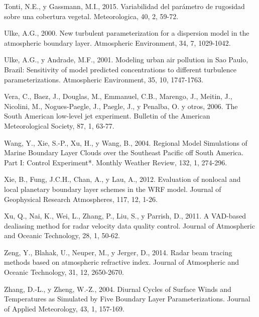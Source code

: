 \documentclass[12pt,spanish,oneside]{book}
\begin{document}
\hypertarget{ref-Tonti2015}{}
Tonti, N.E., y Gassmann, M.I., 2015. Variabilidad del parámetro de
rugosidad sobre una cobertura vegetal. Meteorologica, 40, 2, 59-72.

\hypertarget{ref-Ulke2000}{}
Ulke, A.G., 2000. New turbulent parameterization for a dispersion model
in the atmospheric boundary layer. Atmospheric Environment, 34, 7,
1029-1042.

\hypertarget{ref-Ulke2001}{}
Ulke, A.G., y Andrade, M.F., 2001. Modeling urban air pollution in Sao
Paulo, Brazil: Sensitivity of model predicted concentrations to
different turbulence parameterizations. Atmospheric Environment, 35, 10,
1747-1763.

\hypertarget{ref-Vera2006}{}
Vera, C., Baez, J., Douglas, M., Emmanuel, C.B., Marengo, J., Meitin,
J., Nicolini, M., Nogues-Paegle, J., Paegle, J., y Penalba, O. y otros,
2006. The South American low-level jet experiment. Bulletin of the
American Meteorological Society, 87, 1, 63-77.

\hypertarget{ref-Wang2004}{}
Wang, Y., Xie, S.-P., Xu, H., y Wang, B., 2004. Regional Model
Simulations of Marine Boundary Layer Clouds over the Southeast Pacific
off South America. Part I: Control Experiment*. Monthly Weather Review,
132, 1, 274-296.

\hypertarget{ref-Xie2012}{}
Xie, B., Fung, J.C.H., Chan, A., y Lau, A., 2012. Evaluation of nonlocal
and local planetary boundary layer schemes in the WRF model. Journal of
Geophysical Research Atmospheres, 117, 12, 1-26.

\hypertarget{ref-Xu2011}{}
Xu, Q., Nai, K., Wei, L., Zhang, P., Liu, S., y Parrish, D., 2011. A
VAD-based dealiasing method for radar velocity data quality control.
Journal of Atmospheric and Oceanic Technology, 28, 1, 50-62.

\hypertarget{ref-Zeng2014}{}
Zeng, Y., Blahak, U., Neuper, M., y Jerger, D., 2014. Radar beam tracing
methods based on atmospheric refractive index. Journal of Atmospheric
and Oceanic Technology, 31, 12, 2650-2670.

\hypertarget{ref-Zhang2004}{}
Zhang, D.-L., y Zheng, W.-Z., 2004. Diurnal Cycles of Surface Winds and
Temperatures as Simulated by Five Boundary Layer Parameterizations.
Journal of Applied Meteorology, 43, 1, 157-169.
\end{document}
